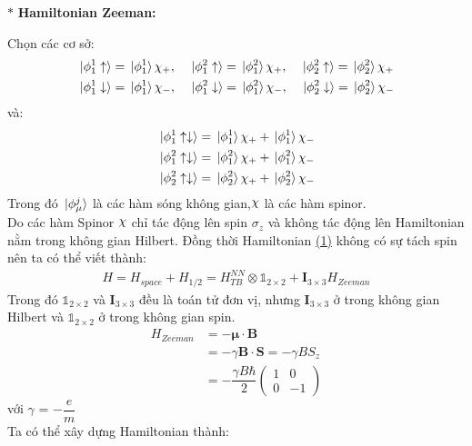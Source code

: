 \documentclass{article}
\DeclareRobustCommand{\rchi}{{\mathpalette\irchi\relax}}
\newcommand{\irchi}[2]{\raisebox{\depth}{$#1\chi$}}
\begin{document}
\clearpage

\noindent $\ast$ \textbf{Hamiltonian Zeeman:}

Chọn các cơ sở:
\begin{align*}
	\ket*{\phi^1_1 \uparrow}   & = \ket*{\phi^1_1}\chi_{+},\quad \ket*{\phi^2_1 \uparrow} = \ket*{\phi^2_1}\chi_+ ,\quad \ket*{\phi^2_2 \uparrow} = \ket*{\phi^2_2}\chi_+       \\
	\ket*{\phi^1_1 \downarrow} & =	\ket*{\phi^1_1 }\chi_- , \quad 	\ket*{\phi^2_1 \downarrow} = \ket*{\phi^2_1 }\chi_-, \quad \ket*{\phi^2_2 \downarrow} = \ket*{\phi^2_2 }\chi_-
\end{align*}
và:
\begin{align*}
	\ket*{\phi^1_1 \uparrow\downarrow} & = \ket*{\phi^1_1}\chi_+ + \ket*{\phi^1_1}\chi_- \\
	\ket*{\phi^2_1 \uparrow\downarrow} & = \ket*{\phi^2_1}\chi_+ + \ket*{\phi^2_1}\chi_- \\
	\ket*{\phi^2_2 \uparrow\downarrow} & = \ket*{\phi^2_2}\chi_+ + \ket*{\phi^2_2}\chi_-
\end{align*}
Trong đó $\ket*{\phi_\mu^j}$ là các hàm sóng không gian,$\rchi$ là các hàm spinor. \\
Do các hàm Spinor $\rchi$ chỉ tác động lên spin $\sigma_z$ và không tác động lên Hamiltonian nằm trong không gian Hilbert. Đồng thời Hamiltonian \hyperref[eq:1]{(1)} không có sự tách spin nên ta có thể viết thành:
\begin{align}
	H = H_{space} + H_{1/2} =  H_{TB}^{NN} \otimes \mathbb{1}_{2\times2} + \mathbf{I}_{3\times3} H_{Zeeman}
\end{align}
Trong đó $\mathbb{1}_{2\times2}$ và $\mathbf{I}_{3\times3}$ đều là toán tử đơn vị, nhưng $\mathbf{I}_{3\times3}$ ở trong không gian Hilbert và $\mathbb{1}_{2\times2}$ ở trong không gian spin.
\begin{align*}
	H_{Zeeman} & = -\boldsymbol{\mu}\cdot \mathbf{B}                \\
	           & = -\gamma \mathbf{B}\cdot\mathbf{S} = -\gamma BS_z \\
	           & = -\dfrac{\gamma B\hbar}{2}
	\begin{pmatrix}
		1 & 0  \\
		0 & -1
	\end{pmatrix}
\end{align*}
với $\gamma$ = $-\dfrac{e}{m}$\\
Ta có thể xây dựng Hamiltonian thành:
\end{document}
